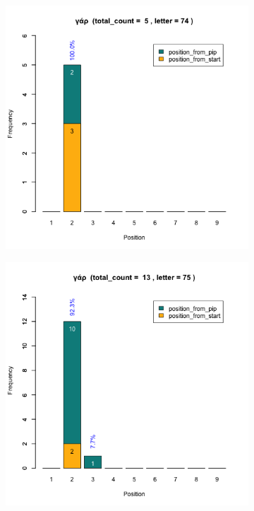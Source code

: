 \documentclass[a4paper]{article}
\begin{document}
\begin{figure}
\begin{subfigure}{0.45\textwidth}
\end{subfigure}
\begin{subfigure}{0.45\textwidth}
\centering
\includegraphics[width=1\linewidth]{../../data/output/paul_R_par/plots/par1_lt74.png}
\end{subfigure}
\begin{subfigure}{0.45\textwidth}
\centering
\includegraphics[width=1\linewidth]{../../data/output/paul_R_par/plots/par1_lt75.png}

\end{subfigure}
\end{figure}
\end{document}
